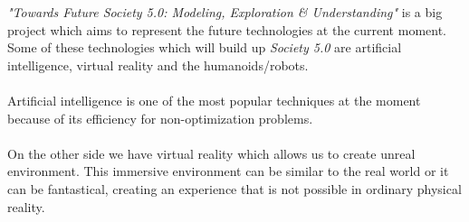 \documentclass[documentation.tex]{subfiles}
\begin{document}
	\textit{"Towards Future Society 5.0: Modeling, Exploration \& Understanding"} is a big project which aims to represent the future technologies at the current moment. Some of these technologies which will build up \textit{Society 5.0} are artificial intelligence, virtual reality and the humanoids/robots. \\ \\
	Artificial intelligence is one of the most popular techniques at the moment because of its efficiency for non-optimization problems. \\ \\
	On the other side we have virtual reality which allows us to create unreal environment. This immersive environment can be similar to the real world or it can be fantastical, creating an experience that is not possible in ordinary physical reality. \\ \\
\end{document}
